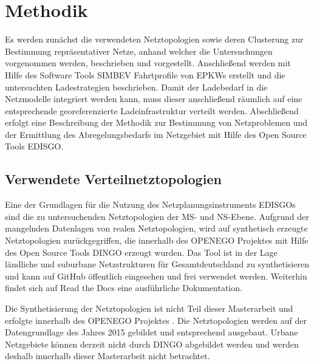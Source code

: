 \section{Methodik}\label{chap:Methodik}

Es werden zunächst die verwendeten Netztopologien sowie deren Clusterung zur Bestimmung repräsentativer Netze, anhand welcher die Untersuchungen vorgenommen werden, beschrieben und vorgestellt.
Anschließend werden mit Hilfe des Software Tools \gls{SIMBEV} Fahrtprofile von \glspl{EPKW} erstellt und die untersuchten Ladestrategien beschrieben.
Damit der Ladebedarf in die Netzmodelle integriert werden kann, muss dieser anschließend räumlich auf eine entsprechende georeferenzierte Ladeinfrastruktur verteilt werden.
Abschließend erfolgt eine Beschreibung der Methodik zur Bestimmung von Netzproblemen und der Ermittlung des Abregelungsbedarfs im Netzgebiet mit Hilfe des Open Source Tools \gls{EDISGO}.


\subsection{Verwendete Verteilnetztopologien}\label{chap:dingo_theo}

Eine der Grundlagen für die Nutzung des Netzplanungsinstruments \glspl{EDISGO} sind die zu untersuchenden Netztopologien der \gls{MS}- und \gls{NS}-Ebene.
Aufgrund der mangelnden Datenlagen von realen Netztopologien, wird auf synthetisch erzeugte Netztopologien zurückgegriffen, die innerhalb des \gls{OPENEGO} Projektes \cite{Mueller2019} mit Hilfe des Open Source Tools \gls{DINGO} erzeugt wurden.
Das Tool ist in der Lage ländliche und suburbane Netzstrukturen für Gesamtdeutschland zu synthetisieren und kann auf GitHub \cite{dingo2019} öffentlich eingesehen und frei verwendet werden.
Weiterhin findet sich auf Read the Docs \cite{dingo-docs2019} eine ausführliche Dokumentation.\medskip

Die Synthetisierung der Netztopologien ist nicht Teil dieser Masterarbeit und erfolgte innerhalb des \gls{OPENEGO} Projektes \cite{Mueller2019}.
Die Netztopologien werden auf der Datengrundlage des Jahres \num{2015} gebildet und entsprechend ausgebaut.
Urbane Netzgebiete können derzeit nicht durch \gls{DINGO} abgebildet werden und werden deshalb innerhalb dieser Masterarbeit nicht betrachtet. \medskip


